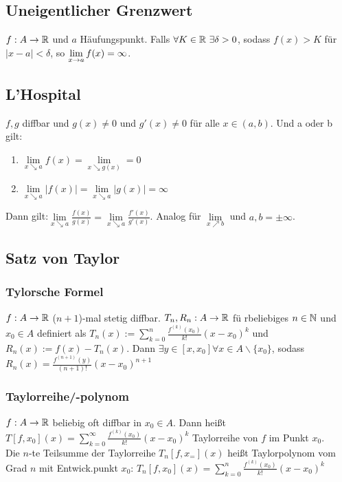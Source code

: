 \subsection*{Uneigentlicher Grenzwert}
$f:A \rightarrow \mathbb R$ und $a$ Häufungspunkt. Falls $\forall K \in \R \ \exists \delta > 0$, sodass $f(x) > K$ für $|x - a| < \delta$, so $\lim\limits_{x \rightarrow a}f(x) = \infty$.
\subsection*{L'Hospital}
$f, g$ diffbar und $g(x) \neq 0$ und $g'(x) \neq 0$ für alle $x \in (a, b)$. Und a oder b gilt:
\begin{enumerate}[label=\alph*., noitemsep]
    \item $\lim\limits_{x \searrow a} f(x) = \lim\limits_{x \searrow g(x)} = 0$
    \item $\lim\limits_{x \searrow a} |f(x)| = \lim\limits_{x \searrow a} |g(x)| = \infty$
\end{enumerate}
Dann gilt:$\lim\limits_{x\searrow a} \frac{f(x)}{g(x)} = \lim\limits_{x \searrow a} \frac{f'(x)}{g'(x)}$. Analog für $\lim\limits_{x \nearrow b}$ und $a, b = \pm \infty$.
\subsection*{Satz von Taylor}
\subsubsection*{Tylorsche Formel}
$f: A \rightarrow \mathbb R$ ($n + 1$)-mal stetig diffbar. $T_n, R_n: A \rightarrow \mathbb R$ fü rbeliebiges $n \in \mathbb N$ und $x_0\in A$ definiert als $T_n(x) := \sum\limits_{k = 0}^n \frac{f^{(k)}(x_0)}{k!}(x - x_0)^k$ und $R_n(x) := f(x) - T_n(x)$. Dann $\exists y\in [x, x_0] \forall x \in A \backslash\{x_0\}$, sodass $R_n(x) = \frac{f^{(n+1)}(y)}{(n+1)!}(x - x_0)^{n+1}$
\subsubsection*{Taylorreihe/-polynom}
$f:A \rightarrow \mathbb R$ beliebig oft diffbar in $x_0 \in A$. Dann heißt $T[f, x_0](x) = \sum\limits_{k = 0}^\infty \frac{f^{(k)}(x_0)}{k!} (x - x_0)^k$ Taylorreihe von $f$ im Punkt $x_0$.\\
Die $n$-te Teilsumme der Taylorreihe $T_n[f, x_=](x)$ heißt Taylorpolynom vom Grad $n$ mit Entwick.punkt $x_0$: $T_n[f, x_0](x) = \sum\limits_{k = 0}^n \frac{f^{(k)}(x_0)}{k!} (x - x_0)^k$